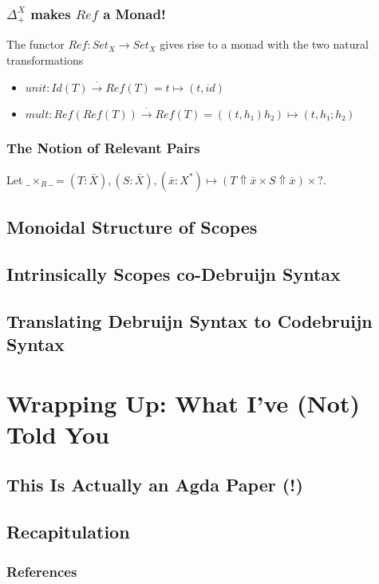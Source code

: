 \documentclass[aspectratio=169]{beamer}
\theoremstyle{remarkstyle}
\begin{document}
\begin{frame}[fragile]
  \frametitle{$Δ_+^X$ makes $Ref$ a Monad!}
  \begin{theorem}
    The functor $Ref : Set_X → Set_X$ gives rise to a monad with the two natural transformations
    \begin{itemize}
      \item $unit : Id(T) \stackrel{⋅}{→} Ref(T) = t ↦ (t, id)$ 
      \item $mult : Ref(Ref(T)) \stackrel{⋅}{→} Ref(T) = ((t, h₁) h₂) ↦ (t, h₁;h₂)$
    \end{itemize}
  \end{theorem}
  \begin{example}
  \end{example}
\end{frame}

\begin{frame}[fragile]
  \frametitle{The Notion of Relevant Pairs}
  \begin{definition}
    Let $\_×_R\_ = (T : \bar{X}), (S : \bar{X}), (\bar{x} : X^*) ↦ (T ⇑ \bar{x} × S ⇑ \bar{x}) × ?$.\\
  \end{definition}
\end{frame}

\subsection{Monoidal Structure of Scopes}
\subsection{Intrinsically Scopes co-Debruijn Syntax}

\subsection{Translating Debruijn Syntax to Codebruijn Syntax}


\section{Wrapping Up: What I've (Not) Told You}
\subsection{This Is Actually an Agda Paper (!)}
\subsection{Recapitulation}

\begin{frame}[fragile]
  \frametitle{References}
  \nocite{catsandtypes}
  \printbibliography{}
\end{frame}
\end{document}
